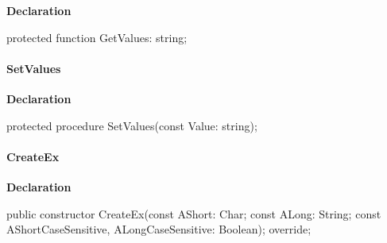 \documentclass{report}
\newif\ifpdf
\begin{document}
\label{PasDoc_OptionParser.TSetOption-GetValues}
\begin{list}{}{
\setlength{\itemindent}{0cm}
\setlength{\listparindent}{0cm}
\setlength{\leftmargin}{\evensidemargin}
\addtolength{\leftmargin}{\tmplength}
\settowidth{\labelsep}{X}
\addtolength{\leftmargin}{\labelsep}
\setlength{\labelwidth}{\tmplength}
}
\item[\textbf{Declaration}\hfill]
\ifpdf
\begin{flushleft}
\fi
\begin{ttfamily}
protected function GetValues: string;\end{ttfamily}

\ifpdf
\end{flushleft}
\fi

\end{list}
\paragraph*{SetValues}\hspace*{\fill}

\label{PasDoc_OptionParser.TSetOption-SetValues}
\begin{list}{}{
\setlength{\itemindent}{0cm}
\setlength{\listparindent}{0cm}
\setlength{\leftmargin}{\evensidemargin}
\addtolength{\leftmargin}{\tmplength}
\settowidth{\labelsep}{X}
\addtolength{\leftmargin}{\labelsep}
\setlength{\labelwidth}{\tmplength}
}
\item[\textbf{Declaration}\hfill]
\ifpdf
\begin{flushleft}
\fi
\begin{ttfamily}
protected procedure SetValues(const Value: string);\end{ttfamily}

\ifpdf
\end{flushleft}
\fi

\end{list}
\paragraph*{CreateEx}\hspace*{\fill}

\label{PasDoc_OptionParser.TSetOption-CreateEx}
\begin{list}{}{
\setlength{\itemindent}{0cm}
\setlength{\listparindent}{0cm}
\setlength{\leftmargin}{\evensidemargin}
\addtolength{\leftmargin}{\tmplength}
\settowidth{\labelsep}{X}
\addtolength{\leftmargin}{\labelsep}
\setlength{\labelwidth}{\tmplength}
}
\item[\textbf{Declaration}\hfill]
\ifpdf
\begin{flushleft}
\fi
\begin{ttfamily}
public constructor CreateEx(const AShort: Char; const ALong: String; const AShortCaseSensitive, ALongCaseSensitive: Boolean); override;\end{ttfamily}

\ifpdf
\end{flushleft}
\fi

\end{list}
\end{document}
